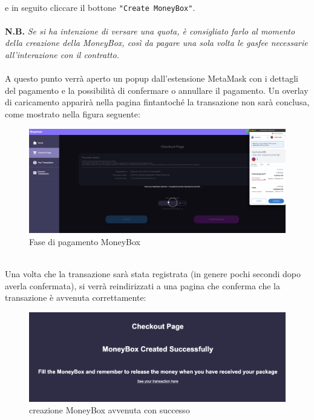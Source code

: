             \textbf{}\\
            e in seguito cliccare il bottone \texttt{"Create MoneyBox"}.\\\\
            \textbf{N.B.} \textit{Se si ha intenzione di versare una quota, è consigliato farlo al momento della creazione della MoneyBox, così da pagare una sola volta le gasfee necessarie all'interazione con il contratto.}\\\\
            A questo punto verrà aperto un popup dall'estensione MetaMask con i dettagli del pagamento e la possibilità di confermare o annullare il pagamento. Un overlay di caricamento apparirà nella pagina \projectName{} fintantoché la transazione non sarà conclusa, come mostrato nella figura seguente:
            \begin{figure}[H]
                \centering
                \includegraphics[scale=0.2]{immagini/Checkout/MoneyBoxLayer.png}
                \caption{Fase di pagamento MoneyBox}
            \end{figure}
            \textbf{}\\
            Una volta che la transazione sarà stata registrata (in genere pochi secondi dopo averla confermata), si verrà reindirizzati a una pagina che conferma che la transazione è avvenuta correttamente:
            \begin{figure}[H]
                \centering
                \includegraphics[scale=0.3]{immagini/Checkout/MoneyBoxTransactionSuccess.png}
                \caption{creazione MoneyBox avvenuta con successo}
            \end{figure}
